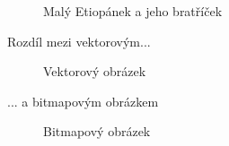 \documentclass[a4paper,11pt]{article}
\begin{document}
\begin{figure}[h]
    \caption{Malý Etiopánek a jeho bratříček}
    \label{figure1}
\end{figure}
\newpage

Rozdíl mezi vektorovým...

\begin{figure}[h]
    \centering
    \caption{Vektorový obrázek}
    \label{figure2}
\end{figure}
\noindent ... a bitmapovým obrázkem
\begin{figure}[h]
    \centering
    \caption{Bitmapový obrázek}
    \label{figure3}
\end{figure}
\end{document}
